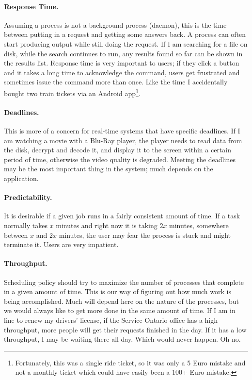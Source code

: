 \paragraph{Response Time.} Assuming a process is not a background process (daemon), this is the time between putting in a request and getting some answers back. A process can often start producing output while still doing the request. If I am searching for a file on disk, while the search continues to run, any results found so far can be shown in the results list. Response time is very important to users; if they click a button and it takes a long time to acknowledge the command, users get frustrated and sometimes issue the command more than once. Like the time I accidentally bought two train tickets via an Android app\footnote{Fortunately, this was a single ride ticket, so it was only a 5 Euro mistake and not a monthly ticket which could have easily been a 100+ Euro mistake.}.

\paragraph{Deadlines.} This is more of a concern for real-time systems that have specific deadlines. If I am watching a movie with a Blu-Ray player, the player needs to read data from the disk, decrypt and decode it, and display it to the screen within a certain period of time, otherwise the video quality is degraded. Meeting the deadlines may be the most important thing in the system; much depends on the application.

\paragraph{Predictability.} It is desirable if a given job runs in a fairly consistent amount of time. If a task normally takes $x$ minutes and right now it is taking $2x$ minutes, somewhere between $x$ and $2x$ minutes, the user may fear the process is stuck and might terminate it. Users are very impatient.

\paragraph{Throughput.} Scheduling policy should try to maximize the number of processes that complete in a given amount of time. This is our way of figuring out how much work is being accomplished. Much will depend here on the nature of the processes, but we would always like to get more done in the same amount of time. If I am in line to renew my drivers' license, if the Service Ontario office has a high throughput, more people will get their requests finished in the day. If it has a low throughput, I may be waiting there all day. Which would never happen. Oh no.

